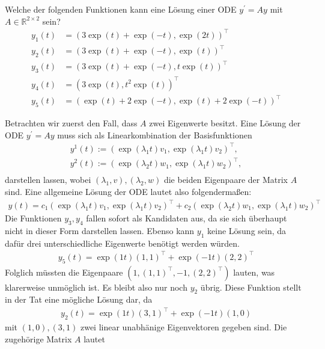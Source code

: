 \begin{exercise}
Welche der folgenden Funktionen kann eine Lösung einer ODE $y^{\prime}
= Ay$ mit $A \in \mathbb{R}^{2\times 2}$ sein?
\begin{align}
  y_1(t) &= (3\exp(t) + \exp(-t), \exp(2t))^{\top} \label{f1}\\
  y_2(t) &= (3\exp(t) + \exp(-t), \exp(t))^{\top} \label{f2}\\
  y_3(t) &= (3\exp(t) + \exp(-t), t\exp(t))^{\top} \label{f3} \\
  y_4(t) &= (3\exp(t), t^2\exp(t))^{\top} \label{f4} \\
  y_5(t) &= (\exp(t) + 2\exp(-t), \exp(t) + 2\exp(-t))^{\top} \label{f5}
\end{align}
\end{exercise}
\begin{solution}
Betrachten wir zuerst den Fall, dass $A$ zwei Eigenwerte besitzt.
Eine Lösung der ODE $y^{\prime} = Ay$ muss sich als Linearkombination
der Basisfunktionen
\begin{align*}
  y^1(t) := (\exp(\lambda_1t)v_1,\exp(\lambda_1t)v_2)^{\top}, \\
  y^2(t) := (\exp(\lambda_2t)w_1,\exp(\lambda_1t)w_2)^{\top}, \\
\end{align*}
darstellen lassen, wobei $(\lambda_1,v), (\lambda_2,w)$ die beiden Eigenpaare
der Matrix $A$ sind.
Eine allgemeine Lösung der ODE lautet also folgendermaßen:
\begin{align*}
  y(t) = c_1(\exp(\lambda_1t)v_1,\exp(\lambda_1t)v_2)^{\top} + c_2(\exp(\lambda_2t)w_1,\exp(\lambda_1t)w_2)^{\top}
\end{align*}
Die Funktionen $y_3,y_4$ fallen sofort als Kandidaten aus, da sie sich überhaupt
nicht in dieser Form darstellen lassen. Ebenso kann $y_1$ keine Lösung sein,
da dafür drei unterschiedliche Eigenwerte benötigt werden würden.
\begin{align*}
  y_5(t) = \exp(1t)(1,1)^{\top} + \exp(-1t)(2,2)^{\top}
\end{align*}
Folglich müssten die Eigenpaare $(1,(1,1)^{\top},-1,(2,2)^{\top})$ lauten, was klarerweise
unmöglich ist.
Es bleibt also nur noch $y_2$ übrig. Diese Funktion stellt in der Tat eine mögliche
Lösung dar, da
\begin{align*}
  y_2(t) = \exp(1t)(3,1)^{\top} + \exp(-1t)(1,0)
\end{align*}
mit $(1,0), (3,1)$ zwei linear unabhänige Eigenvektoren gegeben sind.
Die zugehörige Matrix $A$ lautet
\begin{align*}

\end{align*}
\end{solution}
